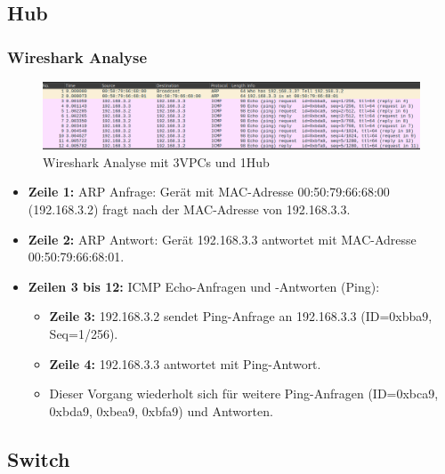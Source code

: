 \documentclass[12pt, a4paper]{article}\usepackage{listings}
\begin{document}
\subsection{Hub}
\subsubsection{Wireshark Analyse}
\begin{figure}[hbtp]
	\centering
	\includegraphics[width=1\textwidth]{images/Wireshark_Ping_HUB.png}
	\caption{Wireshark Analyse mit 3VPCs und 1Hub}
	\label{fig:HUB-Analyse}
\end{figure}

\begin{itemize}
    \item \textbf{Zeile 1:} ARP Anfrage: Gerät mit MAC-Adresse 00:50:79:66:68:00 (192.168.3.2) fragt nach der MAC-Adresse von 192.168.3.3.
    \item \textbf{Zeile 2:} ARP Antwort: Gerät 192.168.3.3 antwortet mit MAC-Adresse 00:50:79:66:68:01.
    \item \textbf{Zeilen 3 bis 12:} ICMP Echo-Anfragen und -Antworten (Ping):
    \begin{itemize}
        \item \textbf{Zeile 3:} 192.168.3.2 sendet Ping-Anfrage an 192.168.3.3 (ID=0xbba9, Seq=1/256).
        \item \textbf{Zeile 4:} 192.168.3.3 antwortet mit Ping-Antwort.
        \item Dieser Vorgang wiederholt sich für weitere Ping-Anfragen (ID=0xbca9, 0xbda9, 0xbea9, 0xbfa9) und Antworten.
    \end{itemize}
\end{itemize}

\newpage

\subsection{Switch}
\end{document}
